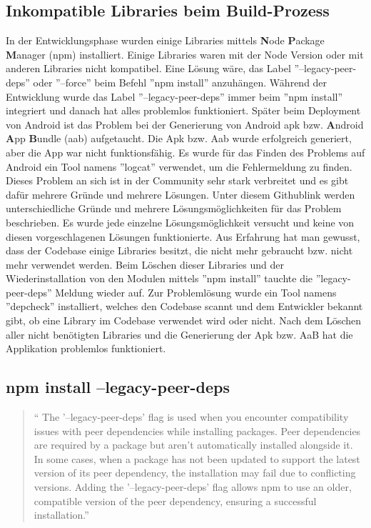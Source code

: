 \begin{spacing}{1}
    \section{Inkompatible Libraries beim Build-Prozess}\label{sec:inkompatible-libraries-beim-build-prozess}
    In der Entwicklungsphase wurden einige Libraries mittels \textbf{N}ode  \textbf{P}ackage \textbf{M}anager (npm) installiert.
    Einige Libraries waren mit der Node Version oder mit anderen Libraries nicht kompatibel.
    Eine Lösung wäre, das Label ''--legacy-peer-deps'' oder ''--force'' beim Befehl ''npm install'' anzuhängen.
    Während der Entwicklung wurde das Label ''--legacy-peer-deps'' immer beim ''npm install'' integriert
    und danach hat alles problemlos funktioniert.
    Später beim Deployment von Android ist das Problem
    bei der Generierung von Android apk bzw.
    \textbf{A}ndroid \textbf{A}pp \textbf{B}undle (aab) aufgetaucht.
    Die Apk bzw.
    Aab wurde erfolgreich generiert, aber die App war nicht funktionsfähig.
    Es wurde für das Finden des Problems auf Android ein Tool namens ''logcat'' verwendet,
    um die Fehlermeldung zu finden.
    Dieses Problem an sich ist in der Community sehr stark verbreitet und es gibt dafür mehrere Gründe und mehrere Lösungen.
    Unter diesem Githublink \cite{libjsexecutor} werden unterschiedliche Gründe und mehrere
    Lösungsmöglichkeiten für das Problem beschrieben.
    Es wurde jede einzelne Lösungsmöglichkeit versucht und keine von diesen vorgeschlagenen Lösungen
    funktionierte.
    Aus Erfahrung hat man gewusst, dass der Codebase einige Libraries besitzt,
    die nicht mehr gebraucht bzw.
    nicht mehr verwendet werden. Beim Löschen dieser Libraries und der Wiederinstallation
    von den Modulen mittels ''npm install'' tauchte die ''legacy-peer-deps'' Meldung wieder auf.
    Zur Problemlösung wurde ein Tool namens ''depcheck'' installiert,
    welches den Codebase scannt und dem Entwickler bekannt gibt, ob eine Library im Codebase verwendet
    wird oder nicht. \cite{depcheck}
    Nach dem Löschen aller nicht benötigten Libraries und die Generierung der
    Apk bzw.
    AaB hat die Applikation problemlos funktioniert.



    \subsection{npm install --legacy-peer-deps}\label{subsec:npm-install---legacy-peer-deps}
    \begin{quotation}
        ``
        The '--legacy-peer-deps' flag is used when you encounter compatibility issues with peer dependencies
        while installing packages.
        Peer dependencies are required by a package but aren't automatically
        installed alongside it.
        In some cases, when a package has not been updated to support the latest
        version of its peer dependency, the installation may fail due to conflicting versions.
        Adding the '--legacy-peer-deps' flag allows npm to use an older, compatible version of
        the peer dependency, ensuring a successful installation.''
        \cite{installFlags}
    \end{quotation}


\end{spacing}

